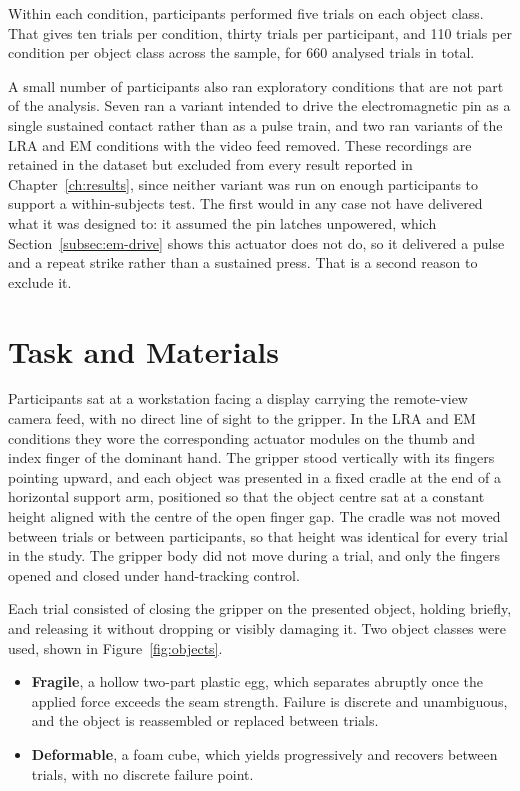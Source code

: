 \documentclass[12pt, a4paper, twoside, openright]{report}
\begin{document}
Within each condition, participants performed five trials on each object class.
That gives ten trials per condition, thirty trials per participant, and 110
trials per condition per object class across the sample, for 660 analysed
trials in total.

A small number of participants also ran exploratory conditions that are not
part of the analysis. Seven ran a variant intended to drive the electromagnetic
pin as a single sustained contact rather than as a pulse train, and two ran
variants of the LRA and EM conditions with the video feed removed. These
recordings are retained in the dataset but excluded from every result reported
in Chapter~\ref{ch:results}, since neither variant was run on enough
participants to support a within-subjects test. The first would in any case not
have delivered what it was designed to: it assumed the pin latches unpowered,
which Section~\ref{subsec:em-drive} shows this actuator does not do, so it
delivered a pulse and a repeat strike rather than a sustained press. That is a
second reason to exclude it.

\section{Task and Materials}
\label{sec:task}

Participants sat at a workstation facing a display carrying the remote-view
camera feed, with no direct line of sight to the gripper. In the LRA and EM
conditions they wore the corresponding actuator modules on the thumb and index
finger of the dominant hand. The gripper stood vertically with its fingers
pointing upward, and each object was presented in a fixed cradle at the end of
a horizontal support arm, positioned so that the object centre sat at a
constant height aligned with the centre of the open finger gap. The cradle was
not moved between trials or between participants, so that height was identical
for every trial in the study. The gripper body did not move during a trial, and
only the fingers opened and closed under hand-tracking control.

Each trial consisted of closing the gripper on the presented object, holding
briefly, and releasing it without dropping or visibly damaging it. Two object
classes were used, shown in Figure~\ref{fig:objects}.

\begin{itemize}
    \item \textbf{Fragile}, a hollow two-part plastic egg, which separates
          abruptly once the applied force exceeds the seam strength. Failure is
          discrete and unambiguous, and the object is reassembled or replaced
          between trials.
    \item \textbf{Deformable}, a foam cube, which yields progressively and
          recovers between trials, with no discrete failure point.
\end{itemize}
\end{document}

